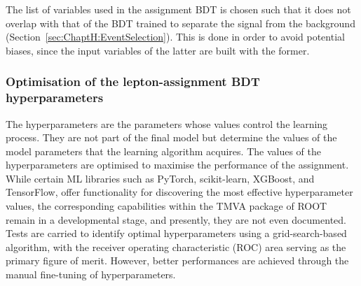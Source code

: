 
The list of variables used in the assignment BDT is chosen such that it does not overlap with that of the BDT 
trained to separate the signal from the background (Section~\ref{sec:ChaptH:EventSelection}). This is done in order
to avoid potential biases, since the input variables of the latter are built with the former.



\subsubsection{Optimisation of the lepton-assignment BDT hyperparameters}
\label{sec:ChaptH:Sig:LepAsign:SS:BDT:hyperparameters}
The hyperparameters are the parameters whose values control the learning process.
They are not part of the final model but determine the values of the model parameters that
the learning algorithm acquires. The values of the hyperparameters are optimised to maximise the 
performance of the assignment.
While certain ML libraries such as PyTorch, scikit-learn, XGBoost, and TensorFlow, 
offer functionality for discovering the most effective hyperparameter values, 
the corresponding capabilities within the TMVA  package of ROOT remain in a developmental stage, 
and presently, they are not even documented. Tests are carried to identify optimal 
hyperparameters using a grid-search-based algorithm, with the receiver operating characteristic (ROC) 
area serving as the primary figure of merit. 
However, better performances are achieved through the manual fine-tuning of hyperparameters.


